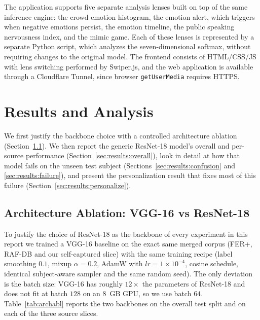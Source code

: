 \documentclass[12pt,a4paper]{article}
\begin{document}
The application supports five separate analysis lenses built on
top of the same inference engine: the crowd emotion histogram,
the emotion alert, which triggers when negative emotions
persist, the emotion timeline, the public speaking nervousness
index, and the mimic game. Each of these lenses is represented
by a separate Python script, which analyzes the
seven-dimensional softmax, without requiring changes to the
original model. The frontend consists of HTML/CSS/JS with lens
switching performed by Swiper.js, and the web application is
available through a Cloudflare Tunnel, since browser
\texttt{getUserMedia} requires HTTPS.

\section{Results and Analysis}
\label{sec:results}

We first justify the backbone choice with a controlled
architecture ablation (Section~\ref{sec:results:archabl}). We
then report the generic ResNet-18 model's overall and
per-source performance (Section~\ref{sec:results:overall}),
look in detail at how that model fails on the unseen test
subject (Sections~\ref{sec:results:confusion} and
\ref{sec:results:failure}), and present the personalization
result that fixes most of this failure
(Section~\ref{sec:results:personalize}).

\subsection{Architecture Ablation: VGG-16 vs ResNet-18}
\label{sec:results:archabl}

To justify the choice of ResNet-18 as the backbone of every
experiment in this report we trained a VGG-16 baseline
\autocite{simonyan2015vgg} on the exact same merged corpus
(FER+, RAF-DB and our self-captured slice) with the same
training recipe (label smoothing $0.1$, mixup $\alpha=0.2$,
AdamW with $lr=1\times 10^{-4}$, cosine schedule, identical
subject-aware sampler and the same random seed). The only
deviation is the batch size: VGG-16 has roughly $12\times$
the parameters of ResNet-18 and does not fit at batch $128$
on an $8$~GB GPU, so we use batch $64$.
Table~\ref{tab:archabl} reports the two backbones on the
overall test split and on each of the three source slices.
\end{document}
